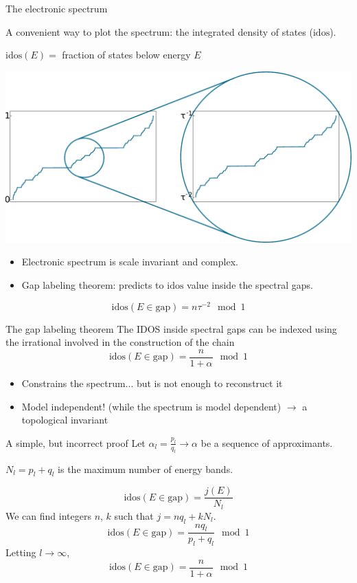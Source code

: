 \documentclass[xcolor=x11names,compress,professionalfonts]{beamer}
\renewcommand{\(}{\begin{columns}}
\renewcommand{\)}{\end{columns}}
\newcommand{\<}[1]{\begin{column}{#1}}
\renewcommand{\>}{\end{column}}
\newcommand{\id}{\ensuremath{\text{idos}}}
\begin{document}
\begin{frame}{The electronic spectrum}

A convenient way to plot the spectrum: the integrated density of states ($\id$).

$\id(E) = $ fraction of states below energy $E$

{\centering
\includegraphics[scale=.35]{img/idos_scaling.pdf}

}

\begin{itemize}
	\item Electronic spectrum is scale invariant and complex.
	\item Gap labeling theorem: predicts to $\id$ value inside the spectral gaps.
\end{itemize}
\[
	\id(E\in \text{gap}) = n \tau^{-2} \mod 1
\]

\end{frame}

\begin{frame}{The gap labeling theorem}
The IDOS inside spectral gaps can be indexed using the irrational involved in the construction of the chain
	\[
		\id(E \in \text{gap}) = \frac{n}{1+\alpha} \mod 1
	\]
\begin{itemize}
	\item Constrains the spectrum... but is not enough to reconstruct it
	\item Model independent! (while the spectrum is model dependent) $\to$ a topological invariant
\end{itemize}

\end{frame}

\begin{frame}{A simple, but incorrect proof}
Let $\alpha_l = \frac{p_l}{q_l} \to \alpha$ be a sequence of approximants.

$N_l = p_l + q_l$ is the maximum number of energy bands.

\[
	\id(E \in \text{gap}) = \frac{j(E)}{N_l}
\]
We can find integers $n$, $k$ such that $j = n q_l + k N_l$.
\[
	\id(E \in \text{gap}) = \frac{n q_l}{p_l + q_l} \mod 1
\]
Letting $l \to \infty$,
	\[
		\id(E \in \text{gap}) = \frac{n}{1+\alpha} \mod 1
	\]

    

\end{frame}
\end{document}
